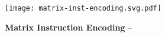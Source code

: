 \begin{figure}[ht]
    \centering
    \texttt{[image: matrix-inst-encoding.svg.pdf]}
    \caption[Matrix Instruction Encoding]{
      \textbf{Matrix Instruction Encoding} --
    }
    \label{fig-spz-mtx-inst-encoding}
\end{figure}
